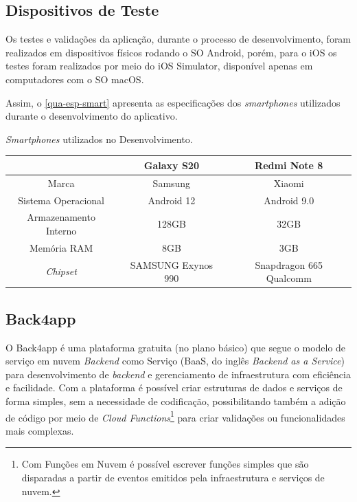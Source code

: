 \subsection{Dispositivos de Teste}

Os testes e validações da aplicação, durante o processo de desenvolvimento, foram realizados em dispositivos físicos
rodando o SO Android, porém, para o iOS os testes foram realizados por meio do iOS Simulator, disponível apenas em
computadores com o SO macOS.

Assim, o \autoref{qua-esp-smart} apresenta as especificações dos \emph{smartphones} utilizados durante o desenvolvimento
do aplicativo.

\begin{quadro}[htb!]
    \begin{center}
        \ABNTEXfontereduzida
        \caption{\label{qua-esp-smart}\emph{Smartphones} utilizados no Desenvolvimento.}
        \begin{tabular}{|c|c|c|}
            \hline
                                  & \textbf{Galaxy S20} & \textbf{Redmi Note 8}   \\
            \hline
            Marca                 & Samsung             & Xiaomi                  \\
            \hline
            Sistema Operacional   & Android 12          & Android 9.0             \\
            \hline
            Armazenamento Interno & 128GB               & 32GB                    \\
            \hline
            Memória RAM           & 8GB                 & 3GB                     \\
            \hline
            \emph{Chipset}        & SAMSUNG Exynos 990  & Snapdragon 665 Qualcomm \\
            \hline
        \end{tabular}
    \end{center}
\end{quadro}

\subsection{Back4app}

O Back4app é uma plataforma gratuita (no plano básico) que segue o modelo de serviço em nuvem \emph{Backend} como Serviço (BaaS, do inglês \emph{Backend as a Service})
para desenvolvimento de \emph{backend} e gerenciamento de infraestrutura com eficiência e facilidade. Com a plataforma é possível
criar estruturas de dados e serviços de forma simples, sem a necessidade de codificação, possibilitando também a adição de código por meio de \emph{Cloud
    Functions}\footnote{Com Funções em Nuvem é possível escrever funções simples que são disparadas a partir de eventos emitidos
    pela infraestrutura e serviços de nuvem.} para criar validações ou funcionalidades mais complexas.

